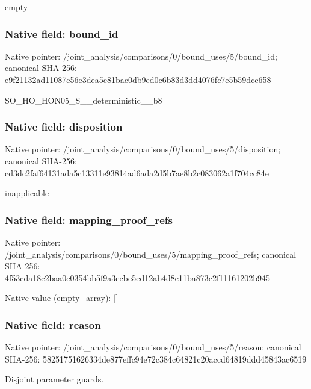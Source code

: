 \documentclass[10pt,a4paper]{article}
\begin{document}
\begingroup\raggedright\sloppy empty\par\endgroup

\subsubsection{Native field: bound\_\allowbreak{}id}
Native pointer: /joint\_\allowbreak{}analysis/comparisons/0/bound\_\allowbreak{}uses/5/bound\_\allowbreak{}id; canonical SHA-256: e9f21132ad11087e56e3dea5c81bac0db9ed0c6b83d3dd4076fc7e5b59dcc658

\begingroup\raggedright\sloppy SO\_\allowbreak{}HO\_\allowbreak{}HON05\_\allowbreak{}S\_\allowbreak{}\_\allowbreak{}deterministic\_\allowbreak{}\_\allowbreak{}b8\par\endgroup

\subsubsection{Native field: disposition}
Native pointer: /joint\_\allowbreak{}analysis/comparisons/0/bound\_\allowbreak{}uses/5/disposition; canonical SHA-256: cd3dc2faf64131ada5c13311e93814ad6ada2d5b7ae8b2c083062a1f704cc84e

\begingroup\raggedright\sloppy inapplicable\par\endgroup

\subsubsection{Native field: mapping\_\allowbreak{}proof\_\allowbreak{}refs}
Native pointer: /joint\_\allowbreak{}analysis/comparisons/0/bound\_\allowbreak{}uses/5/mapping\_\allowbreak{}proof\_\allowbreak{}refs; canonical SHA-256: 4f53cda18c2baa0c0354bb5f9a3ecbe5ed12ab4d8e11ba873c2f11161202b945

Native value (empty\_\allowbreak{}array): []

\subsubsection{Native field: reason}
Native pointer: /joint\_\allowbreak{}analysis/comparisons/0/bound\_\allowbreak{}uses/5/reason; canonical SHA-256: 58251751626334de877effc94e72c384c64821c20accd64819ddd45843ac6519

\begingroup\raggedright\sloppy Disjoint parameter guards.\par\endgroup
\end{document}
